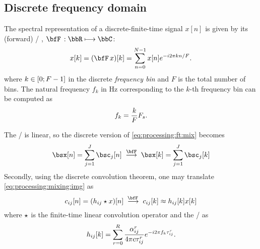 \subsection{Discrete frequency domain}
The spectral representation of a discrete-finite-time signal $x[n]$ is given by its (forward) \DFTdef/
,
$\discreteFT{}:\bbR\kmapsto\bbC$:
\begin{equation}\label{eq:processing:dft}
    x[k] = (\discreteFT{x})[k] =
    \sum_{n = 0}^{N - 1}
    x[n]
    \cste^{-\csti2\pi k n / F}.
\end{equation}
where $k \in \kintervcc{0}{F - 1}$ in the discrete \textit{frequency bin} and $F$ is the total number of bins.
The natural frequency $f_k$ in $\si{\Hz}$ corresponding to the $k$-th frequency bin can be computed as
\begin{equation}\label{eq:processing:fk}
    f_k = \frac{k}{F}F_s
    .
\end{equation}

\mynewline
The \DFT/ is linear, so the discrete version of \cref{eq:processing:ft:mix} becomes
\begin{equation}\label{eq:processing:dft:mix}
    \mics[ n] = \sum_{\idxSrc=1}^{\numSrcs} \imgs_\idxSrc[ n]
    \;\overset{\discreteFT}{\kto}\;
    \mics[ k] = \sum_{\idxSrc=1}^{\numSrcs} \imgs_\idxSrc[ k]
\end{equation}
Secondly, using the discrete convolution theorem, one may translate \cref{eq:processing:mixing:img} as
\begin{equation}\label{eq:processing:discreteModel}
    c_{ij}[n] = (h_{ij} \convDis x)[n]
    \;\overset{\discreteFT{}}{\kto}\;
    c_{ij}[k] \approx h_{ij}[k] x[k]
\end{equation}
where $\star$ is the finite-time linear convolution operator and the \RIR/ as
\begin{equation}\label{eq:processing:discreteModel:rir}
    h_{ij}[ k] = \sum_{r=0}^{R}
                \frac{\alpha_{ij}^r}{4 \pi c \tau_{ij}^r}
                {e}^{- {i} 2 \pi f_k \tau_{ij}^r}
    .
\end{equation}

